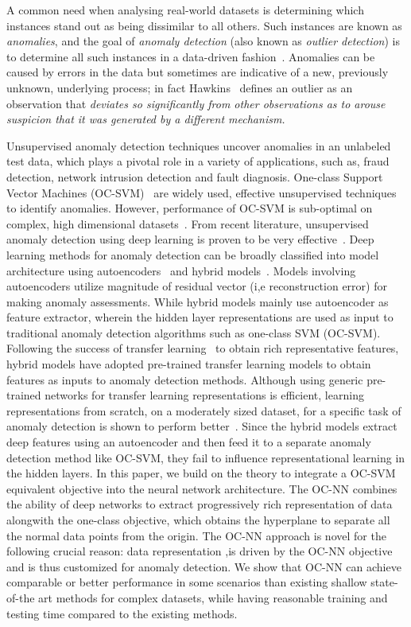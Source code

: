 A common need when analysing real-world datasets is determining which instances stand out as being dissimilar to all others. Such instances are known as \emph{anomalies}, and the goal of \emph{anomaly detection} (also known as \emph{outlier detection}) is to determine all such instances in a data-driven fashion~\cite{chandola2007outlier}. Anomalies can be caused by errors in the data but sometimes are indicative of a new, previously unknown, underlying process; in fact Hawkins~\cite{hawkins1980identification} defines an outlier as an observation that {\it deviates so significantly from other observations as to arouse suspicion that it was generated by a different mechanism.}

Unsupervised anomaly detection techniques uncover anomalies in an unlabeled test data, which plays a pivotal role in a variety of applications, such as, fraud detection, network intrusion detection and fault diagnosis. One-class Support Vector Machines (OC-SVM)~\cite{scholkopf2002support,tax2004support} are widely used, effective unsupervised techniques to identify anomalies. However, performance of OC-SVM is sub-optimal on complex, high dimensional datasets~\cite{vapnik1998statistical,vishwanathan2003simplesvm,bengio2007scaling}.
From recent literature, unsupervised anomaly detection using deep learning is proven to be very effective~\cite{zhou2017anomaly,chalapathy2017robust}. Deep learning methods for anomaly detection can be broadly classified into model architecture using autoencoders~\cite{andrews2016detecting} and hybrid models~\cite{erfani2016high}. Models involving autoencoders utilize magnitude of residual vector (i,e reconstruction error) for making anomaly assessments. While hybrid models mainly use autoencoder as feature extractor, wherein the hidden layer representations are used as input to traditional anomaly detection algorithms such as one-class SVM (OC-SVM). Following the success of transfer learning~\cite{pan2010survey} to obtain rich representative features, hybrid models have adopted pre-trained transfer learning models to obtain features as inputs to anomaly detection methods. Although using generic pre-trained networks for transfer learning representations is efficient, learning representations from scratch, on a moderately sized dataset, for a specific task of anomaly detection is shown to perform better~\cite{andrews2016transfer}. Since the hybrid models extract deep features using an autoencoder and then feed it to a separate anomaly detection method like OC-SVM, they fail to influence representational learning in the hidden layers. In this paper, we build on the theory to integrate a OC-SVM equivalent objective into the neural network architecture. The OC-NN combines the ability of deep networks to extract progressively rich representation of data alongwith the one-class objective, which obtains the hyperplane to separate all the normal data points from the origin. The OC-NN approach is novel for the following crucial reason:  data representation ,is driven by the OC-NN objective and is thus customized for anomaly detection. We show that OC-NN can achieve comparable or better performance in some scenarios than existing shallow state-of-the art methods for complex datasets, while having reasonable training and testing time compared to the existing methods.
